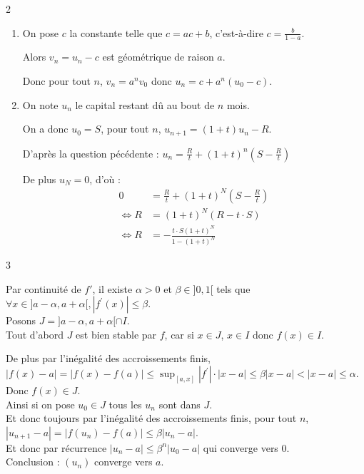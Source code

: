 \begin{correction}{2}
\begin{enumerate}
    \item 
    On pose $c$ la constante telle que $c=ac+b$, c'est-à-dire $c=\frac{b}{1-a}$.

    Alors $v_{n}=u_{n}-c$ est géométrique de raison $a$.

    Donc pour tout $n$, $v_{n}=a^{n}v_{0}$ donc $u_{n}=c+a^{n}(u_{0}-c)$.

    \item 
    On note $u_{n}$ le capital restant dû au bout de $n$ mois.

    On a donc $u_{0}=S$, pour tout $n$, $u_{n+1}=(1+t)u_{n}-R$.

    D'après la question pécédente : $u_n = \frac{R}{t} + (1+t)^n(S - \frac{R}{t})$

    De plus $u_N = 0$, d'où :
    \begin{align*}
        0 &= \frac{R}{t} + (1+t)^N(S-\frac{R}{t})\\
        \iff R &= (1+t)^N(R-t\cdot S)\\
        \iff R &= -\frac{t\cdot S(1+t)^N}{1-(1+t)^N}
    \end{align*}
\end{enumerate}
\end{correction}

\begin{correction}{3}

    Par continuité de $f'$, il existe $\alpha>0$ et $\beta\in]0,1[$ tels que $\forall x\in]a-\alpha,a+\alpha[, |f^{\prime}(x)|\leqslant\beta$. \\
    Posons $J=]a-\alpha,a+\alpha[\cap I$. \\
    Tout d'abord $J$ est bien stable par $f$, car si $x\in J$, $x\in I$ donc $f(x)\in I$.

    De plus par l'inégalité des accroissements finis, \\
    $|f(x)-a|=|f(x)-f(a)|\leqslant \sup_{[a,x]}|f^{\prime}|\cdot|x-a|\leqslant\beta|x-a| < |x-a| \leqslant \alpha$. Donc $f(x)\in J$. \\

    Ainsi si on pose $u_{0}\in J$ tous les $u_{n}$ sont dans $J$. \\
    Et donc toujours par l'inégalité des accroissements finis, pour tout $n$, $|u_{n+1}-a|=|f(u_{n})-f(a)|\leqslant\beta|u_{n}-a|$. \\
    Et donc par récurrence $|u_{n}-a|\leqslant\beta^{n}|u_{0}-a|$ qui converge vers 0. \\

    Conclusion : $(u_n)$ converge vers $a$.
\end{correction}

